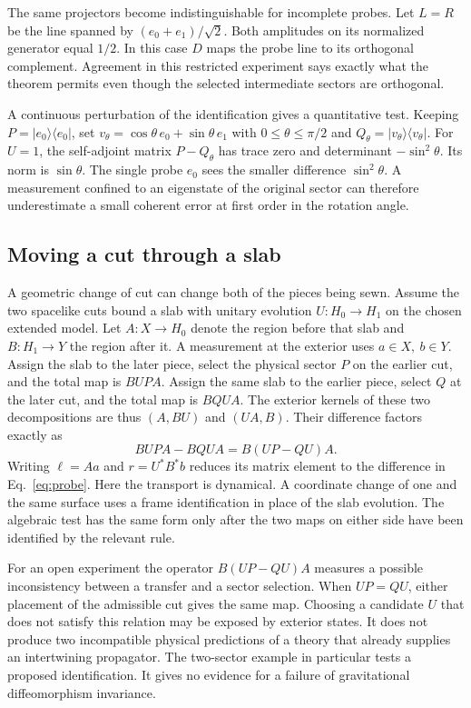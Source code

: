 \documentclass[11pt,letterpaper]{article}
\begin{document}
The same projectors become indistinguishable for incomplete probes.
Let \(L=R\) be the line spanned by \((e_0+e_1)/\sqrt 2\).
Both amplitudes on its normalized generator equal \(1/2\). In this case
\(D\) maps the probe line to its orthogonal complement. Agreement in this
restricted experiment says exactly what the theorem permits even though
the selected intermediate sectors are orthogonal.

A continuous perturbation of the identification gives a quantitative test.
Keeping \(P=|e_0\rangle\langle e_0|\), set
\(v_\theta=\cos\theta\,e_0+\sin\theta\,e_1\) with \(0\leq\theta\leq\pi/2\)
and \(Q_\theta=|v_\theta\rangle\langle v_\theta|\).
For \(U=1\), the self-adjoint matrix \(P-Q_\theta\) has trace zero
and determinant \(-\sin^2\theta\). Its norm is \(\sin\theta\).
The single probe \(e_0\) sees the smaller difference \(\sin^2\theta\).
A measurement confined to an eigenstate of the original sector can
therefore underestimate a small coherent error at first order in the
rotation angle.

\subsection{Moving a cut through a slab}
A geometric change of cut can change both of the pieces being sewn.
Assume the two spacelike cuts bound a slab with unitary evolution
\(U:H_0\to H_1\) on the chosen extended model. Let \(A:X\to H_0\)
denote the region before that slab and \(B:H_1\to Y\) the region after it.
A measurement at the exterior uses \(a\in X,\ b\in Y\). Assign the slab
to the later piece, select the physical sector \(P\) on the earlier cut,
and the total map is \(BUPA\). Assign the same slab to the earlier piece,
select \(Q\) at the later cut, and the total map is \(BQUA\).
The exterior kernels of these two decompositions are thus \((A,BU)\) and
\((UA,B)\). Their difference factors exactly as
\begin{equation}
 BUPA-BQUA=B(UP-QU)A.
 \label{eq:slab}
\end{equation}
Writing \(\ell=Aa\) and \(r=U^*B^*b\) reduces its matrix element to the
difference in Eq.~\eqref{eq:probe}. Here the transport is dynamical.
A coordinate change of one and the same surface uses a frame identification
in place of the slab evolution. The algebraic test has the same form only
after the two maps on either side have been identified by the relevant rule.

For an open experiment the operator \(B(UP-QU)A\) measures a possible
inconsistency between a transfer and a sector selection. When
\(UP=QU\), either placement of the admissible cut gives the same map.
Choosing a candidate \(U\) that does not satisfy this relation
may be exposed by exterior states. It does not produce two incompatible
physical predictions of a theory that already supplies an intertwining
propagator. The two-sector example in particular tests a proposed
identification. It gives no evidence for a failure of gravitational
diffeomorphism invariance.
\end{document}
